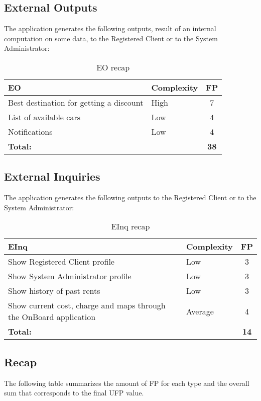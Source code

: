 \subsection{External Outputs}
The application generates the following outputs, result of an internal computation on some data, to the Registered Client or to the System Administrator:

\begin{table}[!h]
\centering
\caption{EO recap}
\label{eo-recap}
\begin{tabularx}{\linewidth}{XXc}
\hline
\textbf{EO}                                      & \textbf{Complexity} & \textbf{FP}     \\ \hline
Best destination for getting a discount & High       & 7 \\
List of available cars                  & Low        & 4 \\
Notifications                           & Low        & 4 \\ \hline
\textbf{Total:}                         &            & \textbf{38}
\end{tabularx}
\end{table}

\subsection{External Inquiries}
The application generates the following outputs to the Registered Client or to the System Administrator:

\begin{table}[!h]
\centering
\caption{EInq recap}
\label{einq-recap}
\begin{tabularx}{\linewidth}{XXc}
\hline
\textbf{EInq}                                    & \textbf{Complexity} & \textbf{FP} \\ \hline
Show Registered Client profile          & Low        & 3 \\
Show System Administrator profile       & Low        & 3 \\
Show history of past rents              & Low        & 3 \\
Show current cost, charge and maps through the OnBoard application & Average & 4 \\ \hline
\textbf{Total:}                         &            & \textbf{14}
\end{tabularx}
\end{table}

\subsection{Recap}
The following table summarizes the amount of FP for each type and the overall sum that corresponds to the ﬁnal UFP value.

